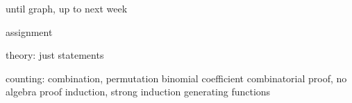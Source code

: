 until graph, up to next week

assignment

theory: just statements

counting: combination, permutation
binomial coefficient
combinatorial proof, no algebra proof
induction, strong induction
generating functions
